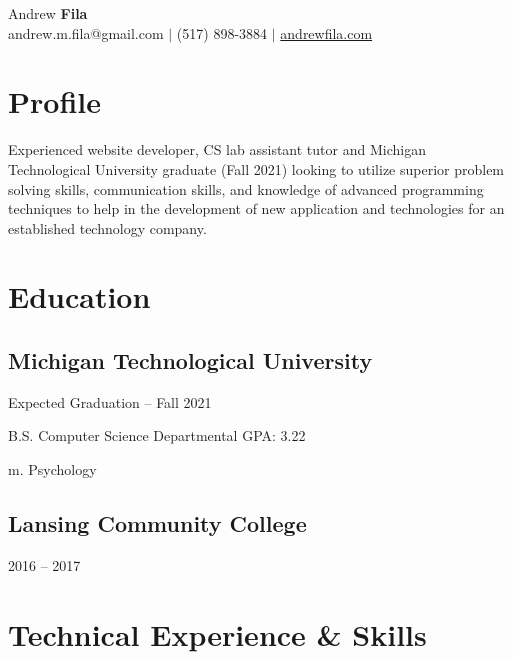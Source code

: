 \documentclass[12pt]{article}
\begin{document}
\begin{center}
    {\fontsize{40}{10}\selectfont Andrew {\bfseries Fila}}\\
    \hspace{-1.5em}andrew.m.fila@gmail.com\hspace{.05in} $|$
    (517) 898-3884\hspace{.05in} $|$
    \href{andrewfila.com}{andrewfila.com}\hspace{.05in}
\end{center}

\section{Profile}
\hspace{1em} Experienced website developer, CS lab assistant tutor and Michigan Technological University graduate (Fall 2021) looking to utilize superior problem solving skills, communication skills, and knowledge of advanced programming techniques to help in the development of new application and technologies for an established technology company.

\section{Education}
\subsection{Michigan Technological University} \hfill Expected Graduation -- Fall 2021

B.S. Computer Science \hfill Departmental GPA: 3.22

m. Psychology%
%
\subsection{Lansing Community College}\hfill
%
2016 -- 2017


\section{Technical Experience \& Skills}
\end{document}
